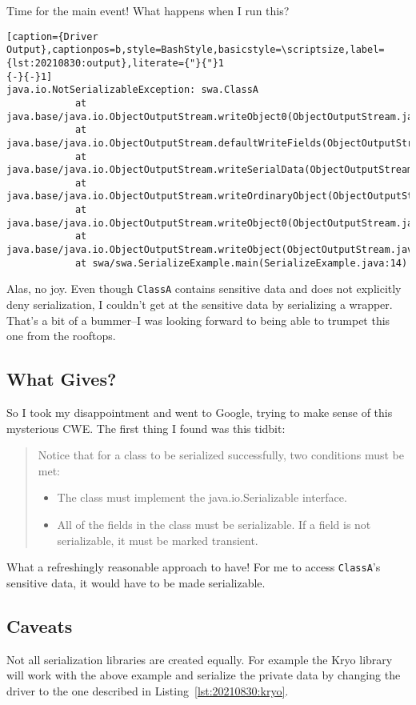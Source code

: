 Time for the main event! What happens when I run this?
\begin{lstlisting}[caption={Driver Output},captionpos=b,style=BashStyle,basicstyle=\scriptsize,label={lst:20210830:output},literate={"}{"}1
{-}{-}1]
java.io.NotSerializableException: swa.ClassA
            at java.base/java.io.ObjectOutputStream.writeObject0(ObjectOutputStream.java:1192)
            at java.base/java.io.ObjectOutputStream.defaultWriteFields(ObjectOutputStream.java:1577)
            at java.base/java.io.ObjectOutputStream.writeSerialData(ObjectOutputStream.java:1534)
            at java.base/java.io.ObjectOutputStream.writeOrdinaryObject(ObjectOutputStream.java:1443)
            at java.base/java.io.ObjectOutputStream.writeObject0(ObjectOutputStream.java:1186)
            at java.base/java.io.ObjectOutputStream.writeObject(ObjectOutputStream.java:352)
            at swa/swa.SerializeExample.main(SerializeExample.java:14)
\end{lstlisting}

Alas, no joy. Even though \texttt{ClassA} contains sensitive data and does not explicitly deny serialization, I couldn't get at the sensitive data by serializing a wrapper. That's a bit of a bummer--I was looking forward to being able to trumpet this one from the rooftops.

\subsection{What Gives?}
So I took my disappointment and went to Google, trying to make sense of this mysterious CWE. The first thing I found was this tidbit:
\begin{quote}
	Notice that for a class to be serialized successfully, two conditions must be met:
	\begin{itemize}
		\item The class must implement the java.io.Serializable interface.
		\item All of the fields in the class must be serializable. If a field is not serializable, it must be marked transient.
	\end{itemize}\autocite{20210830:javaserialization}
\end{quote}

What a refreshingly reasonable approach to have! For me to access \texttt{ClassA}'s sensitive data, it would have to be made serializable.

\subsection{Caveats}
Not all serialization libraries are created equally. For example the Kryo library will work with the above example and serialize the private data by changing the driver to the one described in Listing~\ref{lst:20210830:kryo}.\autocite{20210830:kryo}

